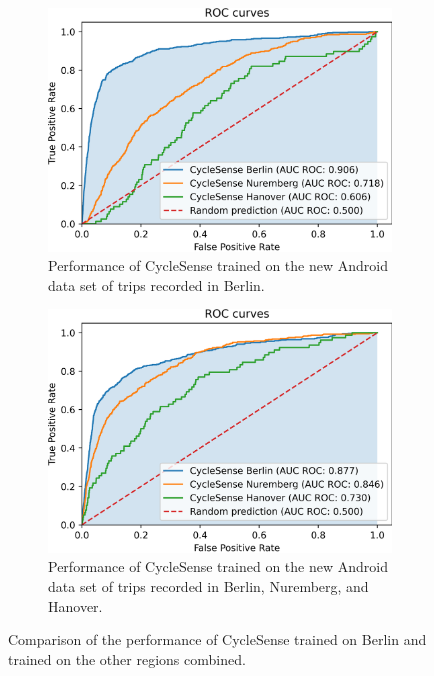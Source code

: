 \begin{figure}%
	\centering
	\begin{subfigure}[b]{0.475\textwidth}
		\centering
		\includegraphics[width=\textwidth]{fig/city_comp_before.png}
		\caption{\small Performance of CycleSense trained on the new Android data set of trips recorded in Berlin. \newline}
		\label{fig:different-city-trained-on-berlin}
	\end{subfigure}
	\hfill
	\begin{subfigure}[b]{0.475\textwidth}
		\centering
		\includegraphics[width=\textwidth]{fig/city_comp_after.png}
		\caption{\small Performance of CycleSense trained on the new Android data set of trips recorded in Berlin, Nuremberg, and Hanover.}
		\label{fig:different-city-trained-individually}
	\end{subfigure}
	\caption{Comparison of the performance of CycleSense trained on Berlin and trained on the other regions combined.}
\end{figure}

